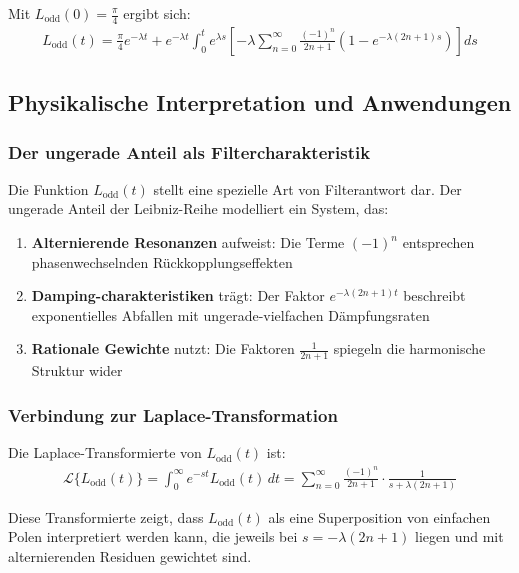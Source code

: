 \documentclass[a4paper, 12pt, twoside, openright]{report}
\theoremstyle{definition}
\theoremstyle{definition}
\begin{document}
Mit $L_{\text{odd}}(0) = \frac{\pi}{4}$ ergibt sich:
\begin{align}
	L_{\text{odd}}(t) = \frac{\pi}{4} e^{-\lambda t} + e^{-\lambda t} \int_0^t e^{\lambda s} \left[ -\lambda \sum_{n=0}^{\infty} \frac{(-1)^n}{2n+1}(1-e^{-\lambda(2n+1)s}) \right] ds
\end{align}

\subsection{Physikalische Interpretation und Anwendungen}

\subsubsection*{Der ungerade Anteil als Filtercharakteristik}

Die Funktion $L_{\text{odd}}(t)$ stellt eine spezielle Art von Filterantwort dar. Der ungerade Anteil der Leibniz-Reihe modelliert ein System, das:

\begin{enumerate}
	\item \textbf{Alternierende Resonanzen} aufweist: Die Terme $(-1)^n$ entsprechen phasenwechselnden Rückkopplungseffekten
	\item \textbf{Damping-charakteristiken} trägt: Der Faktor $e^{-\lambda(2n+1)t}$ beschreibt exponentielles Abfallen mit ungerade-vielfachen Dämpfungsraten
	\item \textbf{Rationale Gewichte} nutzt: Die Faktoren $\frac{1}{2n+1}$ spiegeln die harmonische Struktur wider
\end{enumerate}

\subsubsection*{Verbindung zur Laplace-Transformation}

Die Laplace-Transformierte von $L_{\text{odd}}(t)$ ist:
\begin{align}
	\mathcal{L}\{L_{\text{odd}}(t)\} = \int_0^{\infty} e^{-st} L_{\text{odd}}(t) \, dt = \sum_{n=0}^{\infty} \frac{(-1)^n}{2n+1} \cdot \frac{1}{s + \lambda(2n+1)}
\end{align}

Diese Transformierte zeigt, dass $L_{\text{odd}}(t)$ als eine Superposition von einfachen Polen interpretiert werden kann, die jeweils bei $s = -\lambda(2n+1)$ liegen und mit alternierenden Residuen gewichtet sind.
\end{document}
